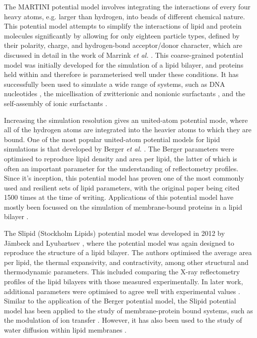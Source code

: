 The MARTINI potential model involves integrating the interactions of every four heavy atoms, e.g. larger than hydrogen, into beads of different chemical nature.
This potential model attempts to simplify the interactions of lipid and protein molecules significantly by allowing for only eighteen particle types, defined by their polarity, charge, and hydrogen-bond acceptor/donor character, which are discussed in detail in the work of Marrink \emph{et al.} \cite{marrink_martini_2007}.
This coarse-grained potential model was initially developed for the simulation of a lipid bilayer, and proteins held within and therefore is parameterised well under these conditions.
It has successfully been used to simulate a wide range of systems, such as DNA nucleotides \cite{uusitalo_martini_2015}, the micellisation of zwitterionic and nonionic surfactants \cite{sanders_micellization_2010}, and the self-assembly of ionic surfactants \cite{wang_coarse-grained_2015}.

Increasing the simulation resolution gives an united-atom potential mode, where all of the hydrogen atoms are integrated into the heavier atoms to which they are bound.
One of the most popular united-atom potential models for lipid simulations is that developed by Berger \emph{et al.} \cite{berger_molecular_1997}.
The Berger parameters were optimised to reproduce lipid density and area per lipid, the latter of which is often an important parameter for the understanding of reflectometry profiles.
Since it's inception, this potential model has proven one of the most commonly used and resilient sets of lipid parameters, with the original paper being cited 1500 times at the time of writing.
Applications of this potential model have mostly been focussed on the simulation of membrane-bound proteins in a lipid bilayer \cite{tieleman_membrane_2006,cordomi_membrane_2012}.

The Slipid (Stockholm Lipids) potential model was developed in 2012 by J\"{a}mbeck and Lyubartsev \cite{jambeck_derivation_2012}, where the potential model was again designed to reproduce the structure of a lipid bilayer.
The authors optimised the average area per lipid, the thermal expansivity, and contractivity, among other structural and thermodynamic parameters.
This included comparing the X-ray reflectometry profiles of the lipid bilayers with those measured experimentally.
In later work, additional parameters were optimised to agree well with experimental values \cite{jambeck_extension_2012,jambeck_another_2013}.
Similar to the application of the Berger potential model, the Slipid potential model has been applied to the study of membrane-protein bound systems, such as the modulation of ion transfer \cite{segala_controlling_2016}.
However, it has also been used to the study of water diffusion within lipid membranes \cite{von_hansen_anomalous_2013}.

